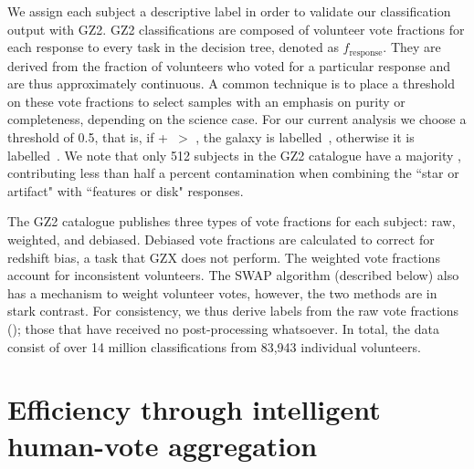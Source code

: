 We assign each subject a descriptive label in order to validate our classification output with GZ2. GZ2 classifications are composed of volunteer vote fractions for each response to every task in the decision tree, denoted as $f_{\mathrm{response}}$. They are derived from the fraction of volunteers who voted for a particular response and are thus approximately continuous. A common technique is to place a threshold on these vote fractions to select samples with an emphasis on purity or completeness, depending on the science case. For our current analysis we choose a threshold of 0.5, that is, if \ffeat+\fstar~$ >$ \fsmooth, the galaxy is labelled~\feat, otherwise it is labelled~\notfeat. We note that only 512 subjects in the GZ2 catalogue have a majority \fstar, contributing less than half a percent contamination when combining the ``star or artifact" with ``features or disk" responses.

The GZ2 catalogue publishes three types of vote fractions for each subject: raw, weighted, and debiased. Debiased vote fractions are calculated to correct for redshift bias, a task that GZX does not perform. The weighted vote fractions account for inconsistent volunteers. The SWAP algorithm (described below) also has a mechanism to weight volunteer votes, however, the two methods are in stark contrast. For consistency, we thus derive labels from the raw vote fractions (\raw); those that have received no post-processing whatsoever. In total, the data consist of over 14 million classifications from 83,943 individual volunteers. 



\section{Efficiency through intelligent human-vote aggregation}\label{sec: SWAP}

